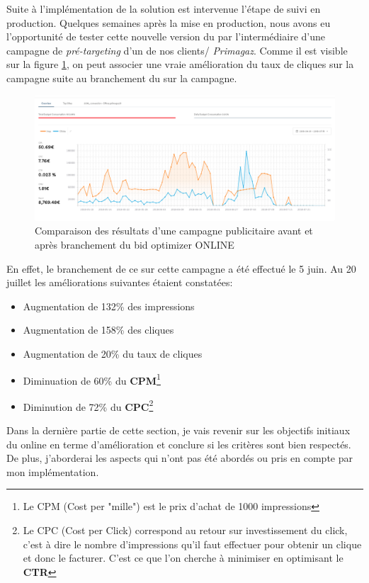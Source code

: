         Suite à l'implémentation de la solution est intervenue l'étape de suivi en production. Quelques semaines après la mise en production, nous avons eu l'opportunité de tester cette nouvelle version du \bo par l'intermédiaire d'une campagne de \emph{pré-targeting} d'un de nos clients/ \emph{Primagaz}. Comme il est visible sur la figure \ref{fig:primagaz}, on peut associer une vraie amélioration du taux de cliques sur la campagne suite au branchement du \bo sur la campagne.
        \begin{figure}[h]
            \includegraphics[width=\linewidth]{images/screen_campaign_primagaz.png}
            \caption{Comparaison des résultats d'une campagne publicitaire avant et après branchement du bid optimizer ONLINE}
            \label{fig:primagaz}
        \end{figure}
        En effet, le branchement de ce \bo sur cette campagne a été effectué le 5 juin. Au 20 juillet les améliorations suivantes étaient constatées:
        \begin{itemize}
            \item Augmentation de 132\% des impressions
            \item Augmentation de 158\% des cliques
            \item Augmentation de 20\% du taux de cliques
            \item Diminuation de 60\% du \textbf{CPM}\footnote{Le CPM (Cost per "mille") est le prix d'achat de 1000 impressions}
            \item Diminution de 72\% du \textbf{CPC}\footnote{Le CPC (Cost per Click) correspond au retour sur investissement du click, c'est à dire le nombre d'impressions qu'il faut effectuer pour obtenir un clique et donc le facturer. C'est ce que l'on cherche à minimiser en optimisant le \textbf{CTR}}
        \end{itemize}
        Dans la dernière partie de cette section, je vais revenir sur les objectifs initiaux du \bo online en terme d'amélioration et conclure si les critères sont bien respectés. De plus, j'aborderai les aspects qui n'ont pas été abordés ou pris en compte par mon implémentation.
       
